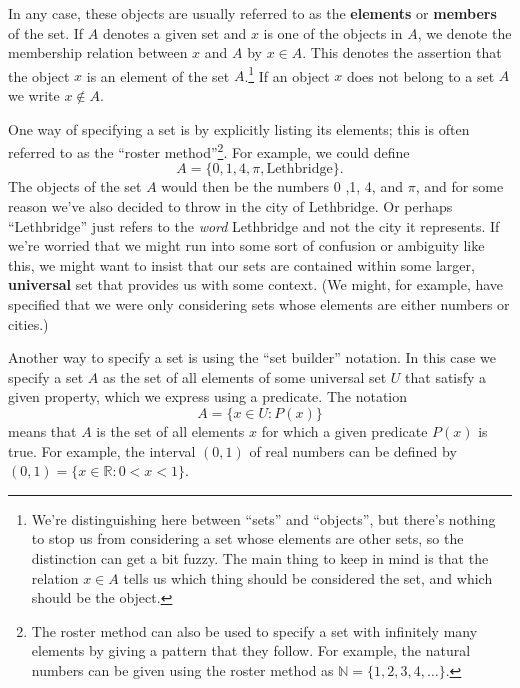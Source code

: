 \documentclass[letterpaper,12pt]{article}
\newcommand{\R}{\mathbb{R}}
\begin{document}
In any case, these objects are usually referred to as the {\bf elements} or {\bf members} of the set. If $A$ denotes a given set and $x$ is one of the objects in $A$, we denote the membership relation between $x$ and $A$ by $x\in A$.  This denotes the assertion that the object $x$ is an element of the set $A$.\footnote{We're distinguishing here between ``sets'' and ``objects'', but there's nothing to stop us from considering a set whose elements are other sets, so the distinction can get a bit fuzzy. The main thing to keep in mind is that the relation $x\in A$ tells us which thing should be considered the set, and which should be the object.} If an object $x$ does not belong to a set $A$ we write $x\notin A$.

One way of specifying a set is by explicitly listing its elements; this is often referred to as the ``roster method''\footnote{The roster method can also be used to specify a set with infinitely many elements by giving a pattern that they follow. For example, the natural numbers can be given using the roster method as $\mathbb{N}=\{1,2,3,4,\ldots\}$.}. For example, we could define
\[
A = \{0,1,4,\pi, \text{Lethbridge}\}.
\]
The objects of the set $A$ would then be the numbers 0 ,1, 4, and $\pi$, and for some reason we've also decided to throw in the city of Lethbridge. Or perhaps ``Lethbridge'' just refers to the {\em word} Lethbridge and not the city it represents. If we're worried that we might run into some sort of confusion or ambiguity like this, we might want to insist that our sets are contained within some larger, {\bf universal} set that provides us with some context. (We might, for example, have specified that we were only considering sets whose elements are either numbers or cities.)

Another way to specify a set is using the ``set builder'' notation. In this case we specify a set $A$ as the set of all elements of some universal set $U$ that satisfy a given property, which we express using a predicate. The notation
\[
A=\{x\in U : P(x)\}
\]
means that $A$ is the set of all elements $x$ for which a given predicate $P(x)$ is true. For example, the interval $(0,1)$ of real numbers can be defined by $(0,1) = \{x\in\R : 0<x<1\}$.
\end{document}
